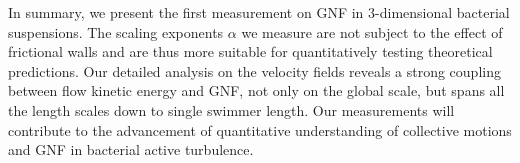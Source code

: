 \documentclass[twocolumn,aps,prl,amsmath,amssymb,longbibliography]{revtex4-2}
\begin{document}
In summary, we present the first measurement on GNF in 3-dimensional bacterial suspensions. The scaling exponents $\alpha$ we measure are not subject to the effect of frictional walls and are thus more suitable for quantitatively testing theoretical predictions.
Our detailed analysis on the velocity fields reveals a strong coupling between flow kinetic energy and GNF, not only on the global scale, but spans all the length scales down to single swimmer length.
Our measurements will contribute to the advancement of quantitative understanding of collective motions and GNF in bacterial active turbulence.



\end{document}
